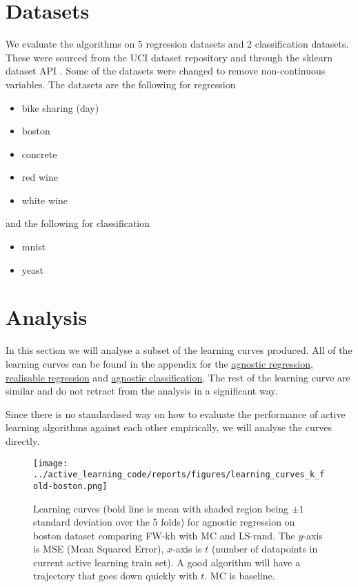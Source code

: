 \section{Datasets}

We evaluate the algorithms on 5 regression datasets and 2 classification
datasets. These were sourced from the UCI dataset repository \citep{dua17_uci_machin_learn_repos} and through the
sklearn dataset API \citep{pedregosa11_scikit_learn}. Some of the datasets
were changed to remove non-continuous variables. The datasets are the following
for regression 
\begin{itemize}
\item bike sharing (day)
\item boston
\item concrete
\item red wine
\item white wine
\end{itemize}
and the following for classification
\begin{itemize}
\item mnist
\item yeast
\end{itemize}

\section{Analysis}

In this section we will analyse a subset of the learning curves produced. All of
the learning curves can be found in the appendix for the
\hyperref[figs:agnostic-regression-learning-curves]{agnostic regression},
\hyperref[figs:realisable-regression-learning-curves]{realisable regression} and
\hyperref[figs:agnostic-classification-learning-curves]{agnostic classification}. The rest of the learning curve are similar and do not retract
from the analysis in a significant way. 

Since there is no standardised way on how to evaluate the performance of active
learning algorithms against each other empirically, we will analyse the curves directly.

\begin{figure}[ht] \centering
  \label{fig:learning-curve-boston-agnostic-experiments}
  \texttt{[image: ../active\_learning\_code/reports/figures/learning\_curves\_k\_fold-boston.png]}
  \caption{Learning curves (bold line is mean with shaded region being \(\pm 1\)
    standard deviation over the 5 folds) for agnostic regression on boston dataset
    comparing FW-kh with MC and LS-rand. The \(y\)-axis is MSE (Mean Squared
    Error), \(x\)-axis is \(t\) (number of datapoints in current active learning
    train set). A good algorithm will have a trajectory that goes down quickly with
    \(t\). MC is baseline.}
\end{figure}

